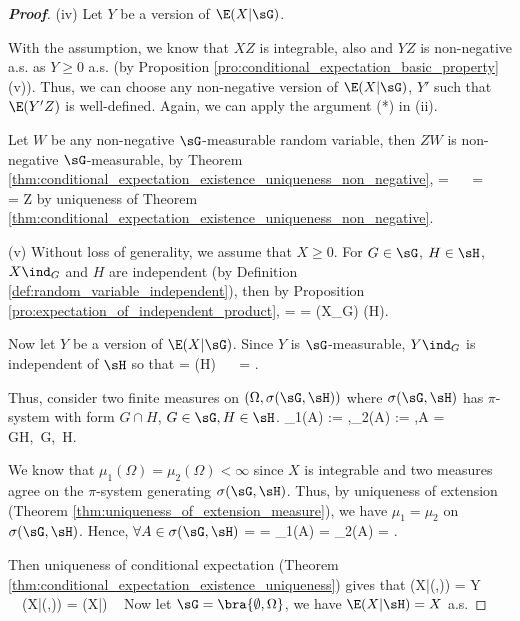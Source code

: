 \begin{proof}[\bf Proof]
\item [(iv)] Let $Y$ be a version of $\E(X|\sG)$.

With the assumption, we know that $XZ$ is integrable, also and $YZ$ is non-negative a.s. as $Y\geq 0$ a.s. (by Proposition \ref{pro:conditional_expectation_basic_property} (v)). Thus, we can choose any non-negative version of $\E(X|\sG)$, $Y'$ such that $\E(Y'Z)$ is well-defined. Again, we can apply the argument (*) in (ii).

Let $W$ be any non-negative $\sG$-measurable random variable, then $ZW$ is non-negative $\sG$-measurable, by Theorem \ref{thm:conditional_expectation_existence_uniqueness_non_negative},
\be
\E{} = \E{} \ \ra\  \E{} = \E{} \ \ra\  \E{} = Z\E{} 
\ee
by uniqueness of Theorem \ref{thm:conditional_expectation_existence_uniqueness_non_negative}.

\item [(v)] Without loss of generality, we assume that $X\geq 0$. For $G\in \sG$, $H\in \sH$, $X\ind_G$ and $H$ are independent (by Definition \ref{def:random_variable_independent}), then by Proposition \ref{pro:expectation_of_independent_product},
\be
\E{} = \E{} = \E(X\ind_G) \pro(H).
\ee

Now let $Y$ be a version of $\E(X|\sG)$. Since $Y$ is $\sG$-measurable, $Y\ind_G$ is independent of $\sH$ so that
\be
\E{} = \E{}\pro(H) \ \ra\ \E{} = \E{}.
\ee

Thus, consider two finite measures on $(\Omega,\sigma(\sG,\sH))$ where $\sigma(\sG,\sH)$ has $\pi$-system with form $G\cap H$, $G\in \sG,H\in \sH$.
\be
\mu_1(A) := \E{},\quad \mu_2(A) := \E{},\quad \forall A = G\cap H,\ G\in \sG,\ H\in \sH.
\ee

We know that $\mu_1(\Omega) = \mu_2(\Omega) < \infty$ since $X$ is integrable and two measures agree on the $\pi$-system generating $\sigma(\sG,\sH)$. Thus, by uniqueness of extension (Theorem \ref{thm:uniqueness_of_extension_measure}), we have $\mu_1 = \mu_2$ on $\sigma(\sG,\sH)$. Hence, $\forall A\in \sigma(\sG,\sH)$
\be
\E{} = \E{} = \mu_1(A) = \mu_2(A) = \E{}.
\ee

Then uniqueness of conditional expectation (Theorem \ref{thm:conditional_expectation_existence_uniqueness}) gives that
\be
\E(X|\sigma(\sG,\sH)) = Y \  \ \ra\ \E(X|\sigma(\sG,\sH)) = \E(X|\sG) \ 
\ee
Now let $\sG = \bra{\emptyset,\Omega}$, we have $\E(X|\sH) = X$ a.s.


\end{proof}
